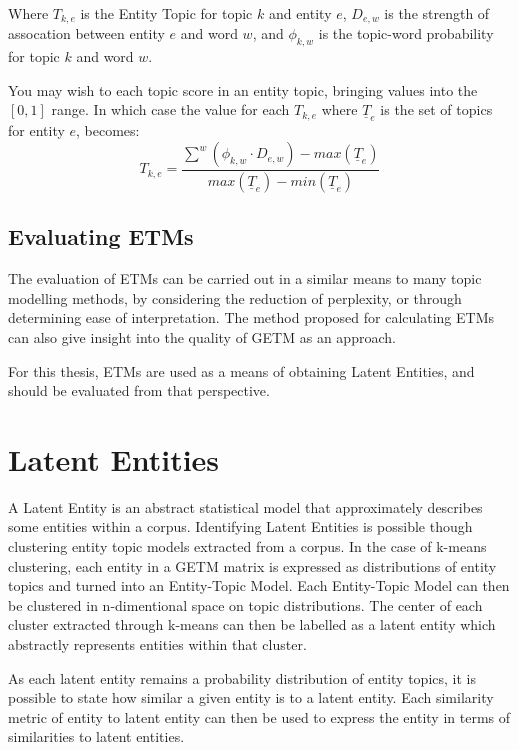 \documentclass[10pt]{report}
\begin{document}
Where  \(T_{k,e}\) is the Entity Topic for topic \(k\) and entity \(e\), \(D_{e,w}\) is the strength of assocation between entity \(e\) and word \(w\), and \(\phi_{k,w}\) is the topic-word probability for topic \(k\) and word \(w\).

You may wish to each topic score in an entity topic, bringing values into the \([0,1]\) range. In which case the value for each \(T_{k,e}\) where \(\underline{T}_e\) is the set of topics for entity \(e\), becomes:
\[
  T_{k,e} = \frac{\sum^w {(\phi_{k,w} \cdot D_{e,w})} - max(\underline{T}_e)}{ max(\underline{T}_e) - min(\underline{T}_e)}
\]

\subsection{Evaluating ETMs}
The evaluation of ETMs can be carried out in a similar means to many topic modelling methods, by considering the reduction of perplexity, or through determining ease of interpretation. The method proposed for calculating ETMs can also give insight into the quality of GETM as an approach.

For this thesis, ETMs are used as a means of obtaining Latent Entities, and should be evaluated from that perspective. 

\section{Latent Entities}
A Latent Entity is an abstract statistical model that approximately describes some entities within a corpus. Identifying Latent Entities is possible though clustering entity topic models extracted from a corpus. In the case of k-means clustering, each entity in a GETM matrix is expressed as distributions of entity topics and turned into an Entity-Topic Model. Each Entity-Topic Model can then be clustered in n-dimentional space on topic distributions. The center of each cluster extracted through k-means can then be labelled as a latent entity which abstractly represents entities within that cluster.

As each latent entity remains a probability distribution of entity topics, it is possible to state how similar a given entity is to a latent entity. Each similarity metric of entity to latent entity can then be used to express the entity in terms of similarities to latent entities.
\end{document}
